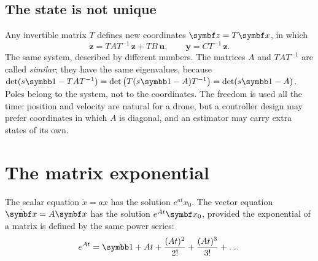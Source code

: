 \subsection{The state is not unique}
Any invertible matrix $T$ defines new coordinates $\symbf z = T\vx$, in which
\begin{equation}
  \dot{\symbf z} = T A T^{-1}\,\symbf z + T B\,\symbf u, \qquad \symbf y = C T^{-1}\,\symbf z .
\end{equation}
The same system, described by different numbers. The matrices $A$ and $TAT^{-1}$ are called \emph{similar}; they have the same eigenvalues, because $\det(s\Id - TAT^{-1}) = \det\big(T(s\Id - A)T^{-1}\big) = \det(s\Id - A)$. Poles belong to the system, not to the coordinates. The freedom is used all the time: position and velocity are natural for a drone, but a controller design may prefer coordinates in which $A$ is diagonal, and an estimator may carry extra states of its own.

\section{The matrix exponential}

The scalar equation $\dot x = ax$ has the solution $e^{at}x_0$. The vector equation $\dot{\vx} = A\vx$ has the solution $e^{At}\vx_0$, provided the exponential of a matrix is defined by the same power series:
\begin{equation}\label{eq:A-expm}
  e^{At} = \Id + At + \frac{(At)^2}{2!} + \frac{(At)^3}{3!} + \dots
\end{equation}

